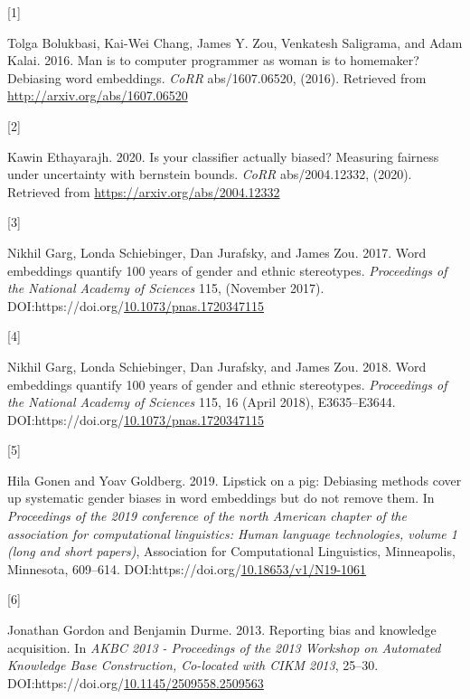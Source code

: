 \documentclass[
  12pt,
  dvipsnames,enabledeprecatedfontcommands]{scrartcl}
\newlength{\cslhangindent}
\newlength{\csllabelwidth}
\newlength{\cslentryspacingunit} %
\newenvironment{CSLReferences}[2] %
 {%
  \setlength{\parindent}{0pt}
  \ifodd #1
  \let\oldpar\par
  \def\par{\hangindent=\cslhangindent\oldpar}
  \fi
  \setlength{\parskip}{#2\cslentryspacingunit}
 }%
 {}
\newcommand{\CSLLeftMargin}[1]{\parbox[t]{\csllabelwidth}{#1}}
\newcommand{\CSLRightInline}[1]{\parbox[t]{\linewidth - \csllabelwidth}{#1}\break}
\begin{document}
\hypertarget{refs}{}
\begin{CSLReferences}{0}{0}
\leavevmode{}%
\CSLLeftMargin{{[}1{]} }%
\CSLRightInline{Tolga Bolukbasi, Kai-Wei Chang, James Y. Zou, Venkatesh
Saligrama, and Adam Kalai. 2016. Man is to computer programmer as woman
is to homemaker? Debiasing word embeddings. \emph{CoRR} abs/1607.06520,
(2016). Retrieved from \url{http://arxiv.org/abs/1607.06520}}

\leavevmode{}%
\CSLLeftMargin{{[}2{]} }%
\CSLRightInline{Kawin Ethayarajh. 2020. Is your classifier actually
biased? Measuring fairness under uncertainty with bernstein bounds.
\emph{CoRR} abs/2004.12332, (2020). Retrieved from
\url{https://arxiv.org/abs/2004.12332}}

\leavevmode{}%
\CSLLeftMargin{{[}3{]} }%
\CSLRightInline{Nikhil Garg, Londa Schiebinger, Dan Jurafsky, and James
Zou. 2017. Word embeddings quantify 100 years of gender and ethnic
stereotypes. \emph{Proceedings of the National Academy of Sciences} 115,
(November 2017).
DOI:https://doi.org/\href{https://doi.org/10.1073/pnas.1720347115}{10.1073/pnas.1720347115}}

\leavevmode{}%
\CSLLeftMargin{{[}4{]} }%
\CSLRightInline{Nikhil Garg, Londa Schiebinger, Dan Jurafsky, and James
Zou. 2018. Word embeddings quantify 100 years of gender and ethnic
stereotypes. \emph{Proceedings of the National Academy of Sciences} 115,
16 (April 2018), E3635--E3644.
DOI:https://doi.org/\href{https://doi.org/10.1073/pnas.1720347115}{10.1073/pnas.1720347115}}

\leavevmode{}%
\CSLLeftMargin{{[}5{]} }%
\CSLRightInline{Hila Gonen and Yoav Goldberg. 2019. Lipstick on a pig:
{D}ebiasing methods cover up systematic gender biases in word embeddings
but do not remove them. In \emph{Proceedings of the 2019 conference of
the north {A}merican chapter of the association for computational
linguistics: Human language technologies, volume 1 (long and short
papers)}, Association for Computational Linguistics, Minneapolis,
Minnesota, 609--614.
DOI:https://doi.org/\href{https://doi.org/10.18653/v1/N19-1061}{10.18653/v1/N19-1061}}

\leavevmode{}%
\CSLLeftMargin{{[}6{]} }%
\CSLRightInline{Jonathan Gordon and Benjamin Durme. 2013. Reporting bias
and knowledge acquisition. In \emph{AKBC 2013 - Proceedings of the 2013
Workshop on Automated Knowledge Base Construction, Co-located with CIKM
2013}, 25--30.
DOI:https://doi.org/\href{https://doi.org/10.1145/2509558.2509563}{10.1145/2509558.2509563}}


\end{CSLReferences}
\end{document}
